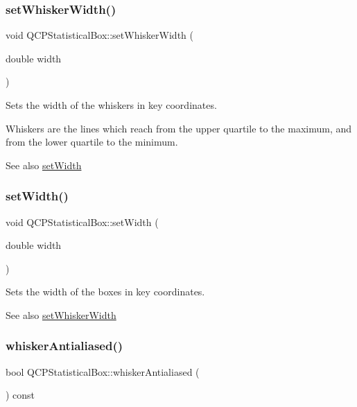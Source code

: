 \subsubsection{\texorpdfstring{setWhiskerWidth()}{setWhiskerWidth()}}
{\footnotesize\ttfamily void Q\+C\+P\+Statistical\+Box\+::set\+Whisker\+Width (\begin{DoxyParamCaption}\item[{double}]{width }\end{DoxyParamCaption})}

Sets the width of the whiskers in key coordinates.

Whiskers are the lines which reach from the upper quartile to the maximum, and from the lower quartile to the minimum.

\begin{DoxySeeAlso}{See also}
\mbox{\hyperlink{class_q_c_p_statistical_box_a0b62775bd67301b1eba5c785f2b26f14}{set\+Width}} 
\end{DoxySeeAlso}
\mbox{\label{class_q_c_p_statistical_box_a0b62775bd67301b1eba5c785f2b26f14}} 
\subsubsection{\texorpdfstring{setWidth()}{setWidth()}}
{\footnotesize\ttfamily void Q\+C\+P\+Statistical\+Box\+::set\+Width (\begin{DoxyParamCaption}\item[{double}]{width }\end{DoxyParamCaption})}

Sets the width of the boxes in key coordinates.

\begin{DoxySeeAlso}{See also}
\mbox{\hyperlink{class_q_c_p_statistical_box_adf378812446bd66f34d1f7f293d991cd}{set\+Whisker\+Width}} 
\end{DoxySeeAlso}
\mbox{\label{class_q_c_p_statistical_box_a2015a8ea758cf65a41d4a6c52a20696b}} 
\subsubsection{\texorpdfstring{whiskerAntialiased()}{whiskerAntialiased()}}
{\footnotesize\ttfamily bool Q\+C\+P\+Statistical\+Box\+::whisker\+Antialiased (\begin{DoxyParamCaption}{ }\end{DoxyParamCaption}) const\hspace{0.3cm}{\ttfamily [inline]}}

